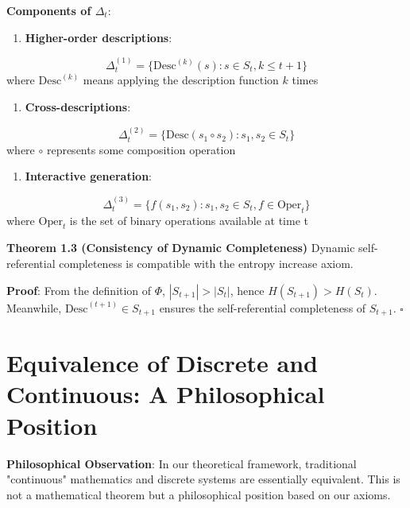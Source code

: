 \textbf{Components of $\Delta_t$}:
\begin{enumerate}
\item \textbf{Higher-order descriptions}:
\end{enumerate}
  
\begin{equation}
\Delta_t^{(1)} = \{\text{Desc}^{(k)}(s) : s \in S_t, k \leq t+1\}
\end{equation}
  where $\text{Desc}^{(k)}$ means applying the description function $k$ times

\begin{enumerate}
\item \textbf{Cross-descriptions}:
\end{enumerate}
  
\begin{equation}
\Delta_t^{(2)} = \{\text{Desc}(s_1 \circ s_2) : s_1, s_2 \in S_t\}
\end{equation}
  where $\circ$ represents some composition operation

\begin{enumerate}
\item \textbf{Interactive generation}:
\end{enumerate}
  
\begin{equation}
\Delta_t^{(3)} = \{f(s_1, s_2) : s_1, s_2 \in S_t, f \in \text{Oper}_t\}
\end{equation}
  where $\text{Oper}_t$ is the set of binary operations available at time t

\textbf{Theorem 1.3 (Consistency of Dynamic Completeness)}
\label{thm:1.3}
Dynamic self-referential completeness is compatible with the entropy increase axiom.

\textbf{Proof}:
From the definition of $\Phi$, $|S_{t+1}| > |S_t|$, hence $H(S_{t+1}) > H(S_t)$.
Meanwhile, $\text{Desc}^{(t+1)} \in S_{t+1}$ ensures the self-referential completeness of $S_{t+1}$. $\square$

\section{Equivalence of Discrete and Continuous: A Philosophical Position}
\label{sec:ch01_axiom_and_derivation:equivalence-of-discrete-and-continuous-a-philosophical-position}

\textbf{Philosophical Observation}: In our theoretical framework, traditional "continuous" mathematics and discrete systems are essentially equivalent. This is not a mathematical theorem but a philosophical position based on our axioms.

